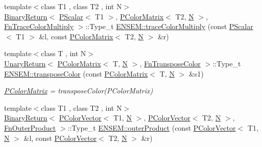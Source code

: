 \begin{DoxyCompactItemize}
\item 
{\footnotesize template$<$class T1 , class T2 , int N$>$ }\\\mbox{\hyperlink{structENSEM_1_1BinaryReturn}{Binary\+Return}}$<$ \mbox{\hyperlink{classENSEM_1_1PScalar}{P\+Scalar}}$<$ T1 $>$, \mbox{\hyperlink{classENSEM_1_1PColorMatrix}{P\+Color\+Matrix}}$<$ T2, \mbox{\hyperlink{adat__devel_2lib_2hadron_2operator__name__util_8cc_a7722c8ecbb62d99aee7ce68b1752f337}{N}} $>$, \mbox{\hyperlink{structENSEM_1_1FnTraceColorMultiply}{Fn\+Trace\+Color\+Multiply}} $>$\+::Type\+\_\+t \mbox{\hyperlink{group__primcolormatrix_ga0e0db533c0e6dc778fc9f271537b96eb}{E\+N\+S\+E\+M\+::trace\+Color\+Multiply}} (const \mbox{\hyperlink{classENSEM_1_1PScalar}{P\+Scalar}}$<$ T1 $>$ \&l, const \mbox{\hyperlink{classENSEM_1_1PColorMatrix}{P\+Color\+Matrix}}$<$ T2, \mbox{\hyperlink{adat__devel_2lib_2hadron_2operator__name__util_8cc_a7722c8ecbb62d99aee7ce68b1752f337}{N}} $>$ \&r)
\item 
{\footnotesize template$<$class T , int N$>$ }\\\mbox{\hyperlink{structENSEM_1_1UnaryReturn}{Unary\+Return}}$<$ \mbox{\hyperlink{classENSEM_1_1PColorMatrix}{P\+Color\+Matrix}}$<$ T, \mbox{\hyperlink{adat__devel_2lib_2hadron_2operator__name__util_8cc_a7722c8ecbb62d99aee7ce68b1752f337}{N}} $>$, \mbox{\hyperlink{structENSEM_1_1FnTransposeColor}{Fn\+Transpose\+Color}} $>$\+::Type\+\_\+t \mbox{\hyperlink{group__primcolormatrix_gad27a30bd1b98827095b42464443c9ffc}{E\+N\+S\+E\+M\+::transpose\+Color}} (const \mbox{\hyperlink{classENSEM_1_1PColorMatrix}{P\+Color\+Matrix}}$<$ T, \mbox{\hyperlink{adat__devel_2lib_2hadron_2operator__name__util_8cc_a7722c8ecbb62d99aee7ce68b1752f337}{N}} $>$ \&s1)
\begin{DoxyCompactList}\small\item\em \mbox{\hyperlink{classENSEM_1_1PColorMatrix}{P\+Color\+Matrix}} = transpose\+Color(\+P\+Color\+Matrix) \end{DoxyCompactList}\item 
{\footnotesize template$<$class T1 , class T2 , int N$>$ }\\\mbox{\hyperlink{structENSEM_1_1BinaryReturn}{Binary\+Return}}$<$ \mbox{\hyperlink{classENSEM_1_1PColorVector}{P\+Color\+Vector}}$<$ T1, \mbox{\hyperlink{adat__devel_2lib_2hadron_2operator__name__util_8cc_a7722c8ecbb62d99aee7ce68b1752f337}{N}} $>$, \mbox{\hyperlink{classENSEM_1_1PColorVector}{P\+Color\+Vector}}$<$ T2, \mbox{\hyperlink{adat__devel_2lib_2hadron_2operator__name__util_8cc_a7722c8ecbb62d99aee7ce68b1752f337}{N}} $>$, \mbox{\hyperlink{structENSEM_1_1FnOuterProduct}{Fn\+Outer\+Product}} $>$\+::Type\+\_\+t \mbox{\hyperlink{group__primcolormatrix_ga4f0b21163125568ab5bcbbef75a17973}{E\+N\+S\+E\+M\+::outer\+Product}} (const \mbox{\hyperlink{classENSEM_1_1PColorVector}{P\+Color\+Vector}}$<$ T1, \mbox{\hyperlink{adat__devel_2lib_2hadron_2operator__name__util_8cc_a7722c8ecbb62d99aee7ce68b1752f337}{N}} $>$ \&l, const \mbox{\hyperlink{classENSEM_1_1PColorVector}{P\+Color\+Vector}}$<$ T2, \mbox{\hyperlink{adat__devel_2lib_2hadron_2operator__name__util_8cc_a7722c8ecbb62d99aee7ce68b1752f337}{N}} $>$ \&r)

\end{DoxyCompactItemize}
